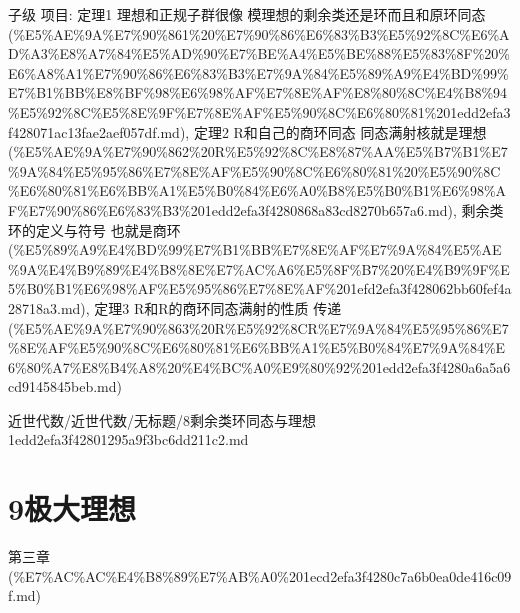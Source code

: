 \begin{note}[8剩余类环同态与理想]

子级 项目: 定理1 理想和正规子群很像 模理想的剩余类还是环而且和原环同态 (\%E5\%AE\%9A\%E7\%90\%861\%20\%E7\%90\%86\%E6\%83\%B3\%E5\%92\%8C\%E6\%AD\%A3\%E8\%A7\%84\%E5\%AD\%90\%E7\%BE\%A4\%E5\%BE\%88\%E5\%83\%8F\%20\%E6\%A8\%A1\%E7\%90\%86\%E6\%83\%B3\%E7\%9A\%84\%E5\%89\%A9\%E4\%BD\%99\%E7\%B1\%BB\%E8\%BF\%98\%E6\%98\%AF\%E7\%8E\%AF\%E8\%80\%8C\%E4\%B8\%94\%E5\%92\%8C\%E5\%8E\%9F\%E7\%8E\%AF\%E5\%90\%8C\%E6\%80\%81\%201edd2efa3f428071ac13fae2aef057df.md), 定理2 R和自己的商环同态 同态满射核就是理想 (\%E5\%AE\%9A\%E7\%90\%862\%20R\%E5\%92\%8C\%E8\%87\%AA\%E5\%B7\%B1\%E7\%9A\%84\%E5\%95\%86\%E7\%8E\%AF\%E5\%90\%8C\%E6\%80\%81\%20\%E5\%90\%8C\%E6\%80\%81\%E6\%BB\%A1\%E5\%B0\%84\%E6\%A0\%B8\%E5\%B0\%B1\%E6\%98\%AF\%E7\%90\%86\%E6\%83\%B3\%201edd2efa3f4280868a83cd8270b657a6.md), 剩余类环的定义与符号 也就是商环 (\%E5\%89\%A9\%E4\%BD\%99\%E7\%B1\%BB\%E7\%8E\%AF\%E7\%9A\%84\%E5\%AE\%9A\%E4\%B9\%89\%E4\%B8\%8E\%E7\%AC\%A6\%E5\%8F\%B7\%20\%E4\%B9\%9F\%E5\%B0\%B1\%E6\%98\%AF\%E5\%95\%86\%E7\%8E\%AF\%201efd2efa3f428062bb60fef4a28718a3.md), 定理3  R和R的商环同态满射的性质 传递 (\%E5\%AE\%9A\%E7\%90\%863\%20R\%E5\%92\%8CR\%E7\%9A\%84\%E5\%95\%86\%E7\%8E\%AF\%E5\%90\%8C\%E6\%80\%81\%E6\%BB\%A1\%E5\%B0\%84\%E7\%9A\%84\%E6\%80\%A7\%E8\%B4\%A8\%20\%E4\%BC\%A0\%E9\%80\%92\%201edd2efa3f4280a6a5a6cd9145845beb.md)

\end{note}

\begin{note}[来源路径]

近世代数/近世代数/无标题/8剩余类环同态与理想 1edd2efa3f42801295a9f3bc6dd211c2.md

\end{note}

\section*{9极大理想}

\begin{note}[来源上级主题]

第三章 (\%E7\%AC\%AC\%E4\%B8\%89\%E7\%AB\%A0\%201ecd2efa3f4280c7a6b0ea0de416c09f.md)

\end{note}

